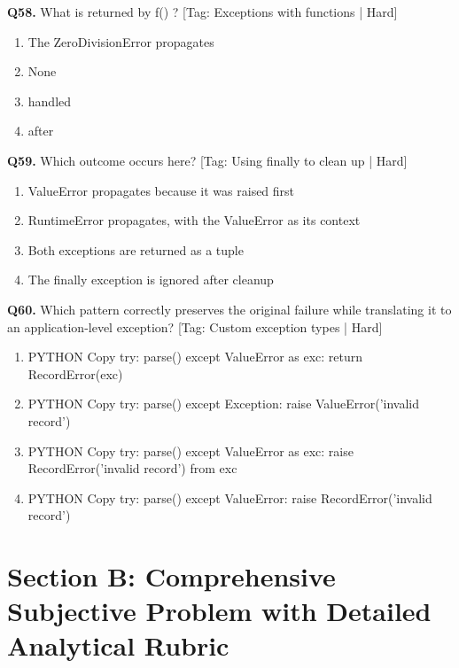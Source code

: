\vspace{2mm}
\noindent\textbf{Q58.} What is returned by f() ? \hfill [Tag: Exceptions with functions | Hard]
\begin{enumerate}[label=(\alph*),topsep=2pt,itemsep=1pt,partopsep=0pt,parsep=0pt]
    \item {The ZeroDivisionError propagates}
    \item {None}
    \item {handled}
    \item {after}
\end{enumerate}
\vspace{2mm}
\noindent\textbf{Q59.} Which outcome occurs here? \hfill [Tag: Using finally to clean up | Hard]
\begin{enumerate}[label=(\alph*),topsep=2pt,itemsep=1pt,partopsep=0pt,parsep=0pt]
    \item {ValueError propagates because it was raised first}
    \item {RuntimeError propagates, with the ValueError as its context}
    \item {Both exceptions are returned as a tuple}
    \item {The finally exception is ignored after cleanup}
\end{enumerate}
\vspace{2mm}
\noindent\textbf{Q60.} Which pattern correctly preserves the original failure while translating it to an application-level exception? \hfill [Tag: Custom exception types | Hard]
\begin{enumerate}[label=(\alph*),topsep=2pt,itemsep=1pt,partopsep=0pt,parsep=0pt]
    \item {PYTHON Copy try: parse() except ValueError as exc: return RecordError(exc)}
    \item {PYTHON Copy try: parse() except Exception: raise ValueError('invalid record')}
    \item {PYTHON Copy try: parse() except ValueError as exc: raise RecordError('invalid record') from exc}
    \item {PYTHON Copy try: parse() except ValueError: raise RecordError('invalid record')}
\end{enumerate}
\vspace{2mm}

\section{Section B: Comprehensive Subjective Problem with Detailed Analytical Rubric}

